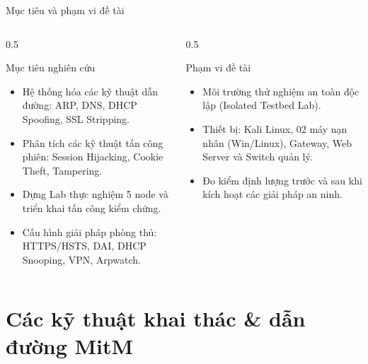 \documentclass[fleqn]{beamer}
\begin{document}
\begin{frame}{Mục tiêu và phạm vi đề tài}
  \begin{columns}
    \begin{column}{0.5\textwidth}
      \begin{block}{Mục tiêu nghiên cứu}
        \begin{itemize}
          \item Hệ thống hóa các kỹ thuật dẫn đường: ARP, DNS, DHCP Spoofing, SSL Stripping.
          \item Phân tích các kỹ thuật tấn công phiên: Session Hijacking, Cookie Theft, Tampering.
          \item Dựng Lab thực nghiệm 5 node và triển khai tấn công kiểm chứng.
          \item Cấu hình giải pháp phòng thủ: HTTPS/HSTS, DAI, DHCP Snooping, VPN, Arpwatch.
        \end{itemize}
      \end{block}
    \end{column}
    \begin{column}{0.5\textwidth}
      \begin{block}{Phạm vi đề tài}
        \begin{itemize}
          \item Môi trường thử nghiệm an toàn độc lập (Isolated Testbed Lab).
          \item Thiết bị: Kali Linux, 02 máy nạn nhân (Win/Linux), Gateway, Web Server và Switch quản lý.
          \item Đo kiểm định lượng trước và sau khi kích hoạt các giải pháp an ninh.
        \end{itemize}
      \end{block}
    \end{column}
  \end{columns}
\end{frame}

\section{Các kỹ thuật khai thác \& dẫn đường MitM}
\end{document}
